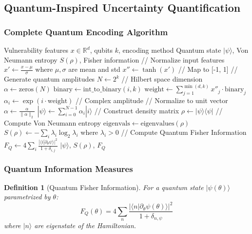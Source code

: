 \documentclass[journal]{IEEEtran}
\newtheorem{definition}{Definition}
\begin{document}
\subsection{Quantum-Inspired Uncertainty Quantification}

\subsubsection{Complete Quantum Encoding Algorithm}

\begin{algorithm}[H]
\caption{Complete Quantum State Encoding}
\label{alg:quantum_complete}
\begin{algorithmic}[1]
\require Vulnerability features $x \in \mathbb{R}^d$, qubits $k$, encoding method
\ensure Quantum state $|\psi\rangle$, Von Neumann entropy $S(\rho)$, Fisher information
\STATE // Normalize input features
\STATE $x' \leftarrow \frac{x - \mu}{\sigma}$ where $\mu, \sigma$ are mean and std
\STATE $x'' \leftarrow \tanh(x')$ // Map to [-1, 1]
\STATE // Generate quantum amplitudes
\STATE $N \leftarrow 2^k$ // Hilbert space dimension
\STATE $\alpha \leftarrow \text{zeros}(N)$
    \STATE $\text{binary} \leftarrow \text{int\_to\_binary}(i, k)$
    \STATE $\text{weight} \leftarrow \sum_{j=1}^{\min(d,k)} x''_j \cdot \text{binary}_j$
    \STATE $\alpha_i \leftarrow \exp(i \cdot \text{weight})$ // Complex amplitude
\ENDFOR
\STATE // Normalize to unit vector
\STATE $\alpha \leftarrow \frac{\alpha}{\|\alpha\|_2}$
\STATE $|\psi\rangle \leftarrow \sum_{i=0}^{N-1} \alpha_i |i\rangle$
\STATE // Construct density matrix
\STATE $\rho \leftarrow |\psi\rangle\langle\psi|$
\STATE // Compute Von Neumann entropy
\STATE $\text{eigenvals} \leftarrow \text{eigenvalues}(\rho)$
\STATE $S(\rho) \leftarrow -\sum_i \lambda_i \log_2 \lambda_i$ where $\lambda_i > 0$
\STATE // Compute Quantum Fisher Information
\STATE $F_Q \leftarrow 4 \sum_i \frac{|\langle i|\partial_\theta \psi\rangle|^2}{1 + \delta_{i,j}}$
\RETURN $|\psi\rangle$, $S(\rho)$, $F_Q$
\end{algorithmic}
\end{algorithm}

\subsubsection{Quantum Information Measures}

\begin{definition}[Quantum Fisher Information]
For a quantum state $|\psi(\theta)\rangle$ parametrized by $\theta$:
$$F_Q(\theta) = 4 \sum_{n} \frac{|\langle n|\partial_\theta \psi(\theta)\rangle|^2}{1 + \delta_{n,\psi}}$$
where $|n\rangle$ are eigenstate of the Hamiltonian.
\end{definition}
\end{document}
